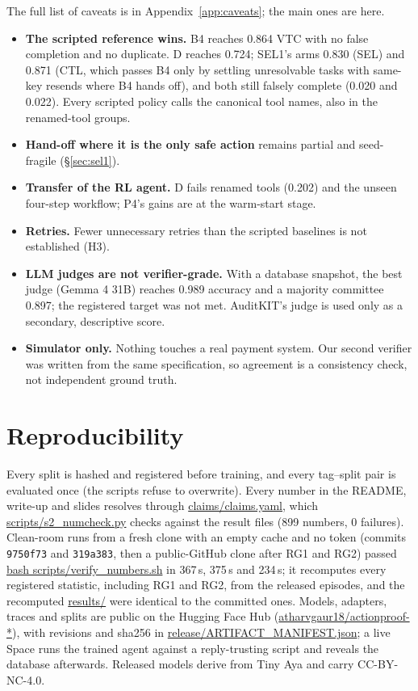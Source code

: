 \documentclass[11pt]{article}
\newcommand{\code}[1]{\texttt{\small #1}}
\begin{document}
The full list of caveats is in Appendix~\ref{app:caveats}; the main ones are here.
\begin{itemize}
\item \textbf{The scripted reference wins.} B4 reaches 0.864 VTC with no false completion and no duplicate. D reaches
0.724; SEL1's arms 0.830 (SEL) and 0.871 (CTL, which passes B4 only by settling unresolvable tasks with same-key
resends where B4 hands off), and both still falsely complete (0.020 and 0.022). Every scripted policy calls the
canonical tool names, also in the renamed-tool groups.
\item \textbf{Hand-off where it is the only safe action} remains partial and seed-fragile (\S\ref{sec:sel1}).
\item \textbf{Transfer of the RL agent.} D fails renamed tools (0.202) and the unseen four-step workflow; P4's gains
are at the warm-start stage.
\item \textbf{Retries.} Fewer unnecessary retries than the scripted baselines is not established (H3).
\item \textbf{LLM judges are not verifier-grade.} With a database snapshot, the best judge (Gemma 4 31B) reaches 0.989
accuracy and a majority committee 0.897; the registered target was not met. AuditKIT's judge
\citep{arora2026auditkit} is used only as a secondary, descriptive score.
\item \textbf{Simulator only.} Nothing touches a real payment system. Our second verifier was written from the same
specification, so agreement is a consistency check, not independent ground truth.
\end{itemize}

\section{Reproducibility}
\label{sec:repro}

Every split is hashed and registered before training, and every tag--split pair is evaluated once (the scripts refuse
to overwrite). Every number in the README, write-up and slides resolves through \url{claims/claims.yaml}, which
\url{scripts/s2_numcheck.py} checks against the result files (899 numbers, 0 failures). Clean-room runs from a
fresh clone with an empty cache and no token (commits \code{9750f73} and \code{319a383}, then a public-GitHub clone
after RG1 and RG2) passed \url{bash scripts/verify_numbers.sh} in 367\,s, 375\,s and 234\,s; it recomputes every
registered statistic, including RG1 and RG2, from the released episodes, and the recomputed \url{results/} were
identical to the committed ones. Models, adapters, traces
and splits are public on the Hugging Face Hub (\url{atharvgaur18/actionproof-*}), with revisions and sha256 in
\url{release/ARTIFACT_MANIFEST.json}; a live Space runs the trained agent against a reply-trusting script and reveals
the database afterwards. Released models derive from Tiny Aya and carry CC-BY-NC-4.0.
\end{document}
